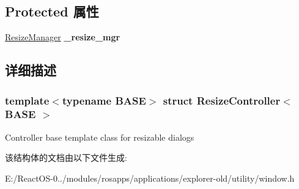 \subsection*{Protected 属性}
\begin{DoxyCompactItemize}
\item 
\mbox{\label{struct_resize_controller_a63a67db009bffdcb4889a635498dcccd}} 
\hyperlink{struct_resize_manager}{Resize\+Manager} {\bfseries \+\_\+resize\+\_\+mgr}
\end{DoxyCompactItemize}


\subsection{详细描述}
\subsubsection*{template$<$typename B\+A\+SE$>$\newline
struct Resize\+Controller$<$ B\+A\+S\+E $>$}

Controller base template class for resizable dialogs 

该结构体的文档由以下文件生成\+:\begin{DoxyCompactItemize}
\item 
E\+:/\+React\+O\+S-\/0../modules/rosapps/applications/explorer-\/old/utility/window.\+h\end{DoxyCompactItemize}
